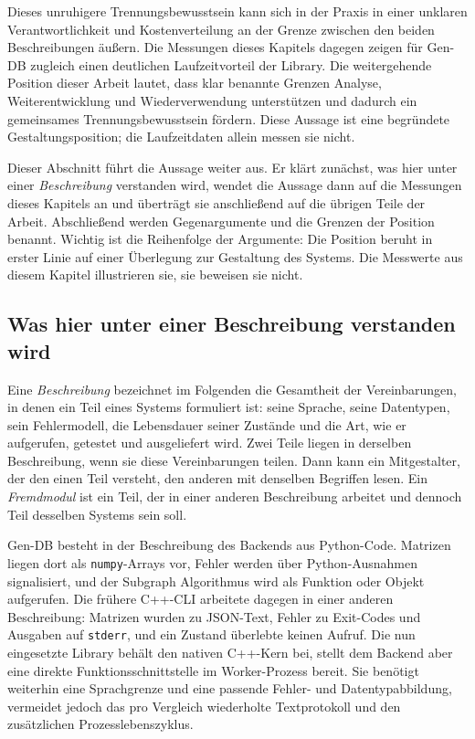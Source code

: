 \documentclass[a4paper,12pt, twoside]{report}
\theoremstyle{definition}
\begin{document}
Dieses unruhigere Trennungsbewusstsein kann sich in der Praxis in einer unklaren Verantwortlichkeit und Kostenverteilung an der Grenze zwischen den beiden Beschreibungen äußern. Die Messungen dieses Kapitels dagegen zeigen für Gen-DB zugleich einen deutlichen Laufzeitvorteil der Library. Die weitergehende Position dieser Arbeit lautet, dass klar benannte Grenzen Analyse, Weiterentwicklung und Wiederverwendung unterstützen und dadurch ein gemeinsames Trennungsbewusstsein fördern. Diese Aussage ist eine begründete Gestaltungsposition; die Laufzeitdaten allein messen sie nicht.

Dieser Abschnitt führt die Aussage weiter aus. Er klärt zunächst, was hier unter einer \emph{Beschreibung} verstanden wird, wendet die Aussage dann auf die Messungen dieses Kapitels an und überträgt sie anschließend auf die übrigen Teile der Arbeit. Abschließend werden Gegenargumente und die Grenzen der Position benannt. Wichtig ist die Reihenfolge der Argumente: Die Position beruht in erster Linie auf einer Überlegung zur Gestaltung des Systems. Die Messwerte aus diesem Kapitel illustrieren sie, sie beweisen sie nicht.

\subsection{Was hier unter einer Beschreibung verstanden wird}
\label{sec:fremde_begriff}

Eine \emph{Beschreibung} bezeichnet im Folgenden die Gesamtheit der Vereinbarungen, in denen ein Teil eines Systems formuliert ist: seine Sprache, seine Datentypen, sein Fehlermodell, die Lebensdauer seiner Zustände und die Art, wie er aufgerufen, getestet und ausgeliefert wird. Zwei Teile liegen in derselben Beschreibung, wenn sie diese Vereinbarungen teilen. Dann kann ein Mitgestalter, der den einen Teil versteht, den anderen mit denselben Begriffen lesen. Ein \emph{Fremdmodul} ist ein Teil, der in einer anderen Beschreibung arbeitet und dennoch Teil desselben Systems sein soll.

Gen-DB besteht in der Beschreibung des Backends aus Python-Code. Matrizen liegen dort als \texttt{numpy}-Arrays vor, Fehler werden über Python-Ausnahmen signalisiert, und der Subgraph Algorithmus wird als Funktion oder Objekt aufgerufen. Die frühere C++-CLI arbeitete dagegen in einer anderen Beschreibung: Matrizen wurden zu JSON-Text, Fehler zu Exit-Codes und Ausgaben auf \texttt{stderr}, und ein Zustand überlebte keinen Aufruf. Die nun eingesetzte Library behält den nativen C++-Kern bei, stellt dem Backend aber eine direkte Funktionsschnittstelle im Worker-Prozess bereit. Sie benötigt weiterhin eine Sprachgrenze und eine passende Fehler- und Datentypabbildung, vermeidet jedoch das pro Vergleich wiederholte Textprotokoll und den zusätzlichen Prozesslebenszyklus.
\end{document}
